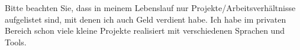 		Bitte beachten Sie, dass in meinem Lebenslauf nur Projekte/Arbeitsverhältnisse aufgelistet sind, mit denen ich auch Geld verdient habe.
		Ich habe im privaten Bereich schon viele kleine Projekte realisiert mit verschiedenen Sprachen und Tools.